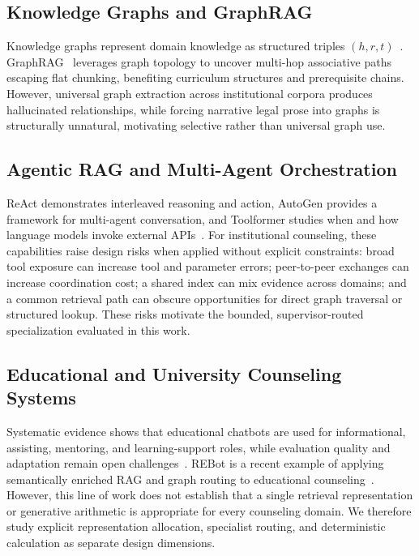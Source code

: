 \subsection{Knowledge Graphs and GraphRAG}
\label{sec:kg_graphrag}

Knowledge graphs represent domain knowledge as structured triples $(h, r, t)$~\cite{pan2024unifying}. GraphRAG~\cite{edge2024graphrag} leverages graph topology to uncover multi-hop associative paths escaping flat chunking, benefiting curriculum structures and prerequisite chains. However, universal graph extraction across institutional corpora produces hallucinated relationships, while forcing narrative legal prose into graphs is structurally unnatural, motivating selective rather than universal graph use.

\subsection{Agentic RAG and Multi-Agent Orchestration}
\label{sec:agentic_multiagent}

ReAct demonstrates interleaved reasoning and action, AutoGen provides a framework for multi-agent conversation, and Toolformer studies when and how language models invoke external APIs~\cite{yao2023react,wu2023autogen,schick2023toolformer}. For institutional counseling, these capabilities raise design risks when applied without explicit constraints: broad tool exposure can increase tool and parameter errors; peer-to-peer exchanges can increase coordination cost; a shared index can mix evidence across domains; and a common retrieval path can obscure opportunities for direct graph traversal or structured lookup. These risks motivate the bounded, supervisor-routed specialization evaluated in this work.

\subsection{Educational and University Counseling Systems}
\label{sec:educational_counseling}

Systematic evidence shows that educational chatbots are used for informational, assisting, mentoring, and learning-support roles, while evaluation quality and adaptation remain open challenges~\cite{wollny2021chatbots}. REBot is a recent example of applying semantically enriched RAG and graph routing to educational counseling~\cite{ma2025rebot}. However, this line of work does not establish that a single retrieval representation or generative arithmetic is appropriate for every counseling domain. We therefore study explicit representation allocation, specialist routing, and deterministic calculation as separate design dimensions.

